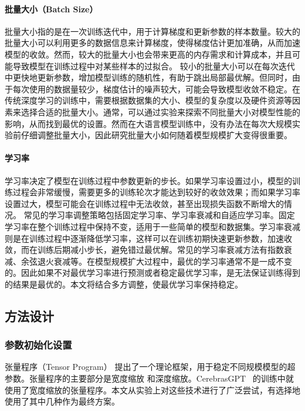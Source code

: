\paragraph{批量大小（Batch Size）}
批量大小指的是在一次训练迭代中，用于计算梯度和更新参数的样本数量。较大的批量大小可以利用更多的数据信息来计算梯度，使得梯度估计更加准确，从而加速模型的收敛。然而，较大的批量大小也会带来更高的内存需求和计算成本，并且可能导致模型在训练过程中对某些样本的过拟合。
较小的批量大小可以在每次迭代中更快地更新参数，增加模型训练的随机性，有助于跳出局部最优解。但同时，由于每次使用的数据量较少，梯度估计的噪声较大，可能会导致模型收敛不稳定。在传统深度学习的训练中，需要根据数据集的大小、模型的复杂度以及硬件资源等因素来选择合适的批量大小。通常，可以通过实验来探索不同批量大小对模型性能的影响，从而找到最优的设置。然而在大语言模型训练中，没有办法在每次大规模实验前仔细调整批量大小，因此研究批量大小如何随着模型规模扩大变得很重要。

\paragraph{学习率}
学习率决定了模型在训练过程中参数更新的步长。如果学习率设置过小，模型的训练过程会非常缓慢，需要更多的训练轮次才能达到较好的收敛效果；而如果学习率设置过大，模型可能会在训练过程中无法收敛，甚至出现损失函数不断增大的情况。
常见的学习率调整策略包括固定学习率、学习率衰减和自适应学习率。固定学习率在整个训练过程中保持不变，适用于一些简单的模型和数据集。学习率衰减则是在训练过程中逐渐降低学习率，这样可以在训练初期快速更新参数，加速收敛，而在训练后期减小步长，避免错过最优解。常见的学习率衰减方法有指数衰减、余弦退火衰减等。在模型规模扩大过程中，最优的学习率通常不是一成不变的。因此如果不对最优学习率进行预测或者稳定最优学习率，是无法保证训练得到的结果是最优的。本文将结合多方调整，使最优学习率保持稳定。

\subsection {方法设计}
\subsubsection {参数初始化设置}
张量程序（Tensor Program）\citep{yang2022tensor, yang2023tensor} 提出了一个理论框架，用于稳定不同规模模型的超参数。张量程序的主要部分是宽度缩放\citep{yang2022tensor} 和深度缩放\citep{yang2023tensor}。CerebrasGPT~\citep{dey2023cerebras} 的训练中就使用了宽度缩放的张量程序。本文从实验上对这些技术进行了广泛尝试，有选择地使用了其中几种作为最终方案。

